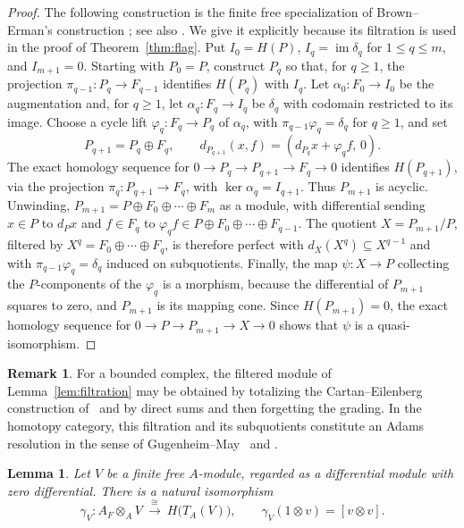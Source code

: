 \documentclass[11pt,reqno]{amsart}
\theoremstyle{plain}
\newtheorem{lemma}[theorem]{Lemma}
\theoremstyle{definition}
\newtheorem{remark}[theorem]{Remark}
\DeclareMathOperator{\im}{im}
\newcommand{\Tate}{T}                 %
\begin{document}
\begin{proof}
The following construction is the finite free specialization of Brown--Erman's construction
\cite[Theorem~3.2]{BrownErman}; see also
\cite[Theorems~2.23 and~2.26]{VandeBogertFlagged}.  We give it explicitly because its filtration is
used in the proof of Theorem~\ref{thm:flag}.
Put $I_0=H(P)$, $I_q=\im\delta_q$ for $1\le q\le m$, and $I_{m+1}=0$.  Starting with $P_0=P$,
construct $P_q$ so that, for $q\ge1$, the projection $\pi_{q-1}\colon P_q\to F_{q-1}$ identifies
$H(P_q)$ with $I_q$.
Let $\alpha_0\colon F_0\to I_0$ be the augmentation and, for $q\ge1$, let
$\alpha_q\colon F_q\to I_q$ be $\delta_q$ with codomain restricted to its image.  Choose a cycle lift
$\varphi_q\colon F_q\to P_q$ of $\alpha_q$, with $\pi_{q-1}\varphi_q=\delta_q$ for $q\ge1$, and set
\[
 P_{q+1}=P_q\oplus F_q,\qquad d_{P_{q+1}}(x,f)=(d_{P_q}x+\varphi_qf,\,0).
\]
The exact homology sequence for $0\to P_q\to P_{q+1}\to F_q\to0$ identifies $H(P_{q+1})$, via the
projection $\pi_q\colon P_{q+1}\to F_q$, with $\ker\alpha_q=I_{q+1}$.  Thus $P_{m+1}$ is acyclic.
Unwinding,
$P_{m+1}=P\oplus F_0\oplus\cdots\oplus F_m$ as a module, with
differential sending $x\in P$ to $d_Px$ and $f\in F_q$ to
$\varphi_qf\in P\oplus F_0\oplus\cdots\oplus F_{q-1}$.  The quotient $X=P_{m+1}/P$, filtered by
$X^{q}=F_0\oplus\cdots\oplus F_q$, is therefore perfect with $d_X(X^{q})\subseteq X^{q-1}$ and with
$\pi_{q-1}\varphi_q=\delta_q$ induced on subquotients.  Finally, the map $\psi\colon X\to P$
collecting the $P$-components of the $\varphi_q$ is a morphism, because the differential of
$P_{m+1}$ squares to zero, and $P_{m+1}$ is its mapping cone.  Since $H(P_{m+1})=0$, the exact
homology sequence for $0\to P\to P_{m+1}\to X\to0$ shows that $\psi$ is a quasi-isomorphism.
\end{proof}

\begin{remark}
For a bounded complex, the filtered module of Lemma~\ref{lem:filtration} may be obtained by
totalizing the Cartan--Eilenberg construction of~\cite[\S5.7]{Weibel} and
\cite[Example~2.27]{VandeBogertFlagged} by direct sums and then forgetting the grading.  In the
homotopy category, this filtration and its subquotients constitute an Adams resolution in the sense
of Gugenheim--May~\cite{GugenheimMay} and
\cite[Definition~10.2, Theorem~11.1]{BarthelMayRiehl}.
\end{remark}

\begin{lemma}\label{lem:zerodiff}
Let $V$ be a finite free $A$-module, regarded as a differential module with zero differential.  There
is a natural isomorphism
\[
\gamma_V\colon A_F\otimes_AV\ \xrightarrow{\ \cong\ }\ H\bigl(\Tate_A(V)\bigr),\qquad
\gamma_V(1\otimes v)=[v\otimes v].
\]
\end{lemma}
\end{document}

